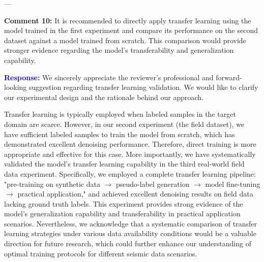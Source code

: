 \documentclass[12pt]{article}
\begin{document}
---

\textbf{Comment 10:}  
It is recommended to directly apply transfer learning using the model trained in the first experiment and compare its performance on the second dataset against a model trained from scratch. This comparison would provide stronger evidence regarding the model's transferability and generalization capability.

\textcolor{blue}{\textbf{Response:}} 
We sincerely appreciate the reviewer's professional and forward-looking suggestion regarding transfer learning validation. We would like to clarify our experimental design and the rationale behind our approach.

Transfer learning is typically employed when labeled samples in the target domain are scarce. However, in our second experiment (the field dataset), we have sufficient labeled samples to train the model from scratch, which has demonstrated excellent denoising performance. Therefore, direct training is more appropriate and effective for this case.
More importantly, we have systematically validated the model's transfer learning capability in the third real-world field data experiment. Specifically, we employed a complete transfer learning pipeline: "pre-training on synthetic data $\rightarrow$ pseudo-label generation $\rightarrow$ model fine-tuning $\rightarrow$ practical application," and achieved excellent denoising results on field data lacking ground truth labels. This experiment provides strong evidence of the model's generalization capability and transferability in practical application scenarios.
Nevertheless, we acknowledge that a systematic comparison of transfer learning strategies under various data availability conditions would be a valuable direction for future research, which could further enhance our understanding of optimal training protocols for different seismic data scenarios.
\end{document}
